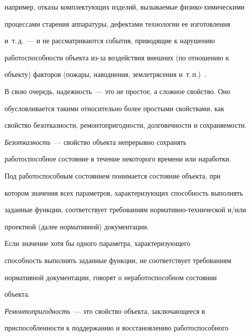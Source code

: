 например, отказы комплектующих изделий, вызываемые физико-химическими 


процессами старения аппаратуры, дефектами технологии ее изготовления 


и~т.\,д.~---  и не рас\-смат\-ри\-ва\-ют\-ся события, приводящие к нарушению 


работоспособности объекта из-за воздействия внешних (по отношению к 


объекту) факторов (пожары, наводнения, землетрясения и~т.\,п.)~\cite{7-2-3}.


     


     В свою очередь, надежность~--- это не простое, а сложное свойство. Оно 


обусловливается такими относительно более простыми свойствами, как 


свойство безотказности, ремонтопригодности, долговечности и сохраняемости.


     


     \textit{Безотказность}~--- свойство объекта непрерывно сохранять 


работоспособное состояние в течение некоторого времени или наработки.


     


     Под работоспособным состоянием понимается состояние объекта, при 


котором значения всех параметров, характеризующих способность выполнять 


заданные функции, соответствует требованиям нормативно-технической и/или 


проектной (далее нормативной) документации. 


     


     Если значение хотя бы одного параметра, характеризующего 


способность выполнять заданные функции, не соответствует требованиям 


нормативной документации, говорят о неработоспособном состоянии 


объекта.


     


     \textit{Ремонтопригодность}~--- это свойство объекта, заключающееся в 


при\-спо\-соб\-лен\-ности к поддержанию и восстановлению работоспособного 


